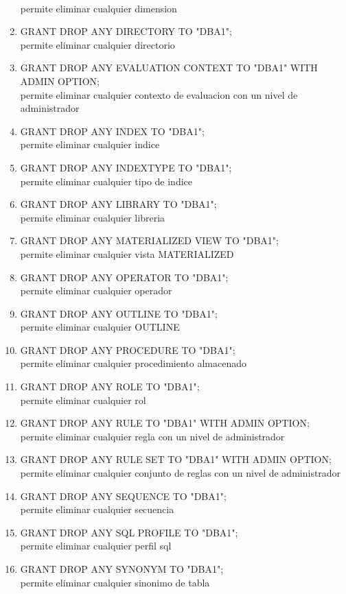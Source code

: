 \begin{enumerate}
\\permite eliminar cualquier dimension
\item GRANT DROP ANY DIRECTORY TO "DBA1";
\\permite eliminar cualquier directorio
\item GRANT DROP ANY EVALUATION CONTEXT TO "DBA1" WITH ADMIN OPTION;
\\permite eliminar cualquier contexto de evaluacion con un nivel de administrador
\item GRANT DROP ANY INDEX TO "DBA1";
\\permite eliminar cualquier indice
\item GRANT DROP ANY INDEXTYPE TO "DBA1";
\\permite eliminar cualquier tipo de indice
\item GRANT DROP ANY LIBRARY TO "DBA1";
\\permite eliminar cualquier libreria
\item GRANT DROP ANY MATERIALIZED VIEW TO "DBA1";
\\permite eliminar cualquier vista MATERIALIZED
\item GRANT DROP ANY OPERATOR TO "DBA1";
\\permite eliminar cualquier operador
\item GRANT DROP ANY OUTLINE TO "DBA1";
\\permite eliminar cualquier OUTLINE
\item GRANT DROP ANY PROCEDURE TO "DBA1";
\\permite eliminar cualquier procedimiento almacenado
\item GRANT DROP ANY ROLE TO "DBA1";
\\permite eliminar cualquier rol
\item GRANT DROP ANY RULE TO "DBA1" WITH ADMIN OPTION;
\\permite eliminar cualquier regla con un nivel de administrador
\item GRANT DROP ANY RULE SET TO "DBA1" WITH ADMIN OPTION;
\\permite eliminar cualquier conjunto de reglas con un nivel de administrador
\item GRANT DROP ANY SEQUENCE TO "DBA1";
\\permite eliminar cualquier secuencia
\item GRANT DROP ANY SQL PROFILE TO "DBA1";
\\permite eliminar cualquier perfil sql
\item GRANT DROP ANY SYNONYM TO "DBA1";
\\permite eliminar cualquier sinonimo de tabla

\end{enumerate}
